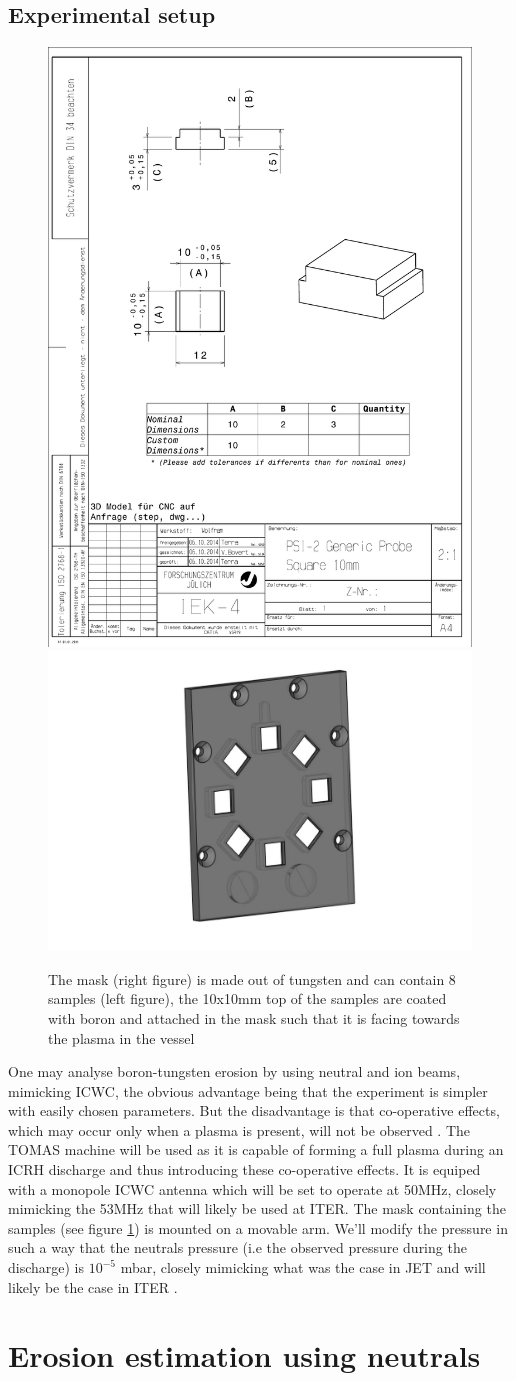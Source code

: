 \documentclass{article}
\begin{document}
\subsection{Experimental setup}
\begin{figure}[ht]
    \centering
    \includegraphics[height=0.33\textwidth]{figures/Sample.pdf}
    \includegraphics[height=0.33\textwidth]{figures/mask.pdf}
    \caption{The mask (right figure) is made out of tungsten and can contain 8 samples (left figure), 
    the 10x10mm top of the samples are coated with boron and attached in the mask such that it is facing towards    the plasma in the vessel}
    \label{fig:samples+mask}
\end{figure}
One may analyse boron-tungsten erosion by using neutral and ion beams,
mimicking ICWC, the obvious advantage being that the experiment is simpler with
easily chosen parameters.  But the disadvantage is that co-operative effects,
which may occur only when a plasma is present, will not be observed
\cite{McCRACKEN}. The TOMAS machine \cite{TOMAS} will be used as it is capable
of forming a full plasma during an ICRH discharge and thus introducing these
co-operative effects.  It is equiped with a monopole ICWC antenna which will be
set to operate at 50MHz, closely mimicking the 53MHz that will likely be used
at ITER.  The mask containing the samples (see figure \ref{fig:samples+mask})
is mounted on a movable arm.  We'll modify the pressure in such a way that the
neutrals pressure (i.e the observed pressure during the discharge) is $10^{-5}$
mbar, closely mimicking what was the case in JET and will likely be the case in
ITER \cite{DOUAI}.
\section{Erosion estimation using neutrals}
\end{document}
